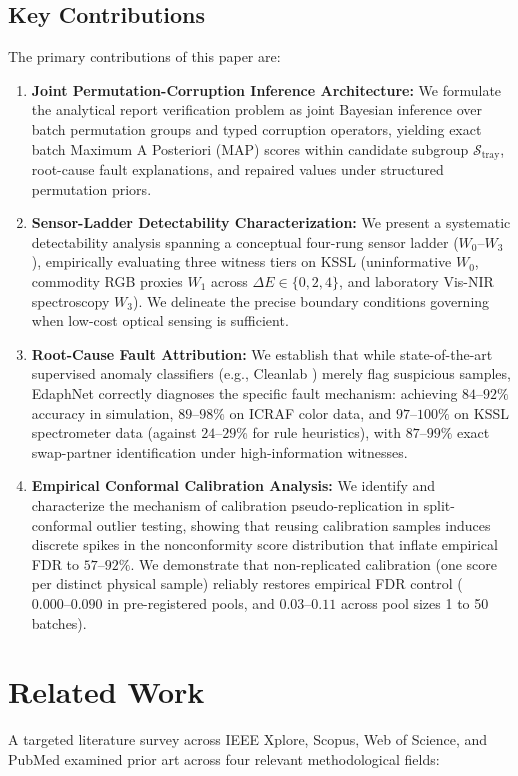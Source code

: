 \documentclass[journal,twoside]{IEEEtran}
\begin{document}
\subsection{Key Contributions}
The primary contributions of this paper are:
\begin{enumerate}
    \item \textbf{Joint Permutation-Corruption Inference Architecture:} We formulate the analytical report verification problem as joint Bayesian inference over batch permutation groups and typed corruption operators, yielding exact batch Maximum A Posteriori (MAP) scores within candidate subgroup $\mathcal{S}_{\text{tray}}$, root-cause fault explanations, and repaired values under structured permutation priors.
    \item \textbf{Sensor-Ladder Detectability Characterization:} We present a systematic detectability analysis spanning a conceptual four-rung sensor ladder ($W_0\text{--}W_3$), empirically evaluating three witness tiers on KSSL (uninformative $W_0$, commodity RGB proxies $W_1$ across $\Delta E \in \{0, 2, 4\}$, and laboratory Vis-NIR spectroscopy $W_3$). We delineate the precise boundary conditions governing when low-cost optical sensing is sufficient.
    \item \textbf{Root-Cause Fault Attribution:} We establish that while state-of-the-art supervised anomaly classifiers (e.g., Cleanlab \cite{zhou2024detecting}) merely flag suspicious samples, EdaphNet correctly diagnoses the specific fault mechanism: achieving $84\text{--}92\%$ accuracy in simulation, $89\text{--}98\%$ on ICRAF color data, and $97\text{--}100\%$ on KSSL spectrometer data (against $24\text{--}29\%$ for rule heuristics), with $87\text{--}99\%$ exact swap-partner identification under high-information witnesses.
    \item \textbf{Empirical Conformal Calibration Analysis:} We identify and characterize the mechanism of calibration pseudo-replication in split-conformal outlier testing, showing that reusing calibration samples induces discrete spikes in the nonconformity score distribution that inflate empirical FDR to $57\text{--}92\%$. We demonstrate that non-replicated calibration (one score per distinct physical sample) reliably restores empirical FDR control ($0.000\text{--}0.090$ in pre-registered pools, and $0.03\text{--}0.11$ across pool sizes 1 to 50 batches).
\end{enumerate}

\section{Related Work}
A targeted literature survey across IEEE Xplore, Scopus, Web of Science, and PubMed examined prior art across four relevant methodological fields:
\end{document}
